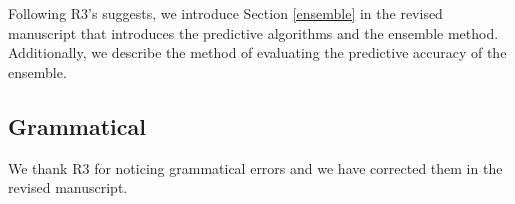 \documentclass[hidelinks,12pt,letterpaper]{article}
\begin{document}
Following R3's suggests, we introduce Section \ref{ensemble} in the revised manuscript that introduces the predictive algorithms and the ensemble method. Additionally, we describe the method of evaluating the predictive accuracy of the ensemble. 

\subsection{Grammatical}

We thank R3 for noticing grammatical errors and we have corrected them in the revised manuscript. 


\printbibliography
\end{document}
